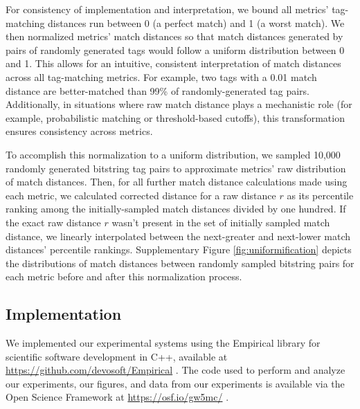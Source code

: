 
For consistency of implementation and interpretation, we bound all metrics' tag-matching distances run between 0 (a perfect match) and 1 (a worst match).
We then normalized metrics' match distances so that match distances generated by pairs of randomly generated tags would follow a uniform distribution between 0 and 1.
This allows for an intuitive, consistent interpretation of match distances across all tag-matching metrics.
For example, two tags with a 0.01 match distance are better-matched than 99\% of randomly-generated tag pairs.
Additionally, in situations where raw match distance plays a mechanistic role (for example, probabilistic matching or threshold-based cutoffs), this transformation ensures consistency across metrics.

To accomplish this normalization to a uniform distribution, we sampled 10,000 randomly generated bitstring tag pairs to approximate metrics' raw distribution of match distances.
Then, for all further match distance calculations made using each metric, we calculated corrected distance for a raw distance $r$ as its percentile ranking among the initially-sampled match distances divided by one hundred.
If the exact raw distance $r$ wasn't present in the set of initially sampled match distance, we linearly interpolated between the next-greater and next-lower match distances' percentile rankings.
Supplementary Figure \ref{fig:uniformification} depicts the distributions of match distances between randomly sampled bitstring pairs for each metric before and after this normalization process.

\subsection{Implementation}

We implemented our experimental systems using the Empirical library for scientific software development in C++, available at \url{https://github.com/devosoft/Empirical} \citep{charles_ofria_2019_2575607}.
The code used to perform and analyze our experiments, our figures, and data from our experiments is available via the Open Science Framework at \url{https://osf.io/gw5mc/} \citep{foster2017open}.


